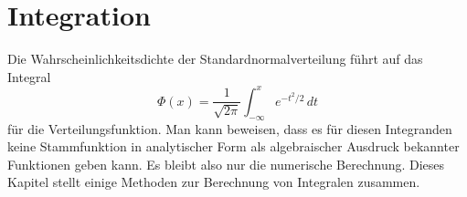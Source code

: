 %
%
%
\chapter{Integration\label{chapter:integration}}
Die Wahrscheinlichkeitsdichte der Standardnormalverteilung führt 
auf das Integral
\[
\Phi(x) 
=
\frac{1}{\sqrt{2\pi}}
\int_{-\infty}^x e^{-t^2/2}\,dt
\]
für die Verteilungsfunktion.
Man kann beweisen, dass es für diesen Integranden keine Stammfunktion
in analytischer Form als algebraischer Ausdruck bekannter Funktionen
geben kann.
Es bleibt also nur die numerische Berechnung.
Dieses Kapitel stellt einige Methoden zur Berechnung von Integralen
zusammen. 




